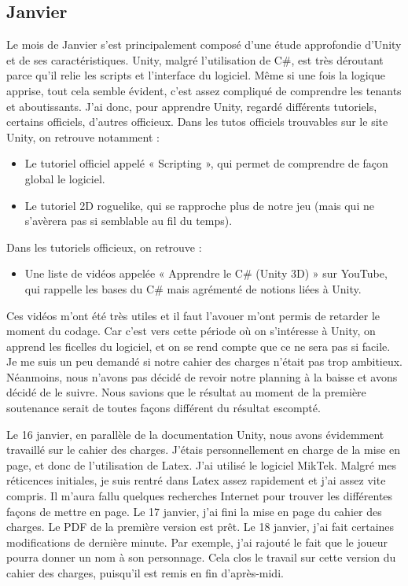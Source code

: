 \documentclass[]{extarticle}
\begin{document}
\begin{spacing}{1.25}
\subsection{Janvier}
\bigbreak
\bigbreak
Le mois de Janvier s’est principalement composé d’une étude approfondie d’Unity et de ses caractéristiques. Unity, malgré l’utilisation de C\#, est très déroutant parce qu’il relie les scripts et l’interface du logiciel. Même si une fois la logique apprise, tout cela semble évident, c’est assez compliqué de comprendre les tenants et aboutissants. 
\bigbreak
J’ai donc, pour apprendre Unity, regardé différents tutoriels, certains officiels, d’autres officieux. Dans les tutos officiels trouvables sur le site Unity, on retrouve notamment :
\bigbreak
\begin{itemize}
\item Le tutoriel officiel appelé « Scripting », qui permet de comprendre de façon global le logiciel.
\item Le tutoriel 2D roguelike, qui se rapproche plus de notre jeu (mais qui ne s’avèrera pas si semblable au fil du temps).
\end{itemize}
Dans les tutoriels officieux, on retrouve :
\bigbreak
\begin{itemize}
\item Une liste de vidéos appelée « Apprendre le C\# (Unity 3D) » sur YouTube, qui rappelle les bases du C\# mais agrémenté de notions liées à Unity.
\end{itemize}
\bigbreak
Ces vidéos m’ont été très utiles et il faut l’avouer m’ont permis de retarder le moment du codage. Car c’est vers cette période où on s’intéresse à Unity, on apprend les ficelles du logiciel, et on se rend compte que ce ne sera pas si facile. Je me suis un peu demandé si notre cahier des charges n’était pas trop ambitieux. 
\bigbreak
Néanmoins, nous n’avons pas décidé de revoir notre planning à la baisse et avons décidé de le suivre. Nous savions que le résultat au moment de la première soutenance serait de toutes façons différent du résultat escompté.
\bigbreak

\bigbreak
\bigbreak

 Le 16 janvier, en parallèle de la documentation Unity, nous avons évidemment travaillé sur le cahier des charges. J’étais personnellement en charge de la mise en page, et donc de l’utilisation de Latex. J’ai utilisé le logiciel MikTek.
\bigbreak
Malgré mes réticences initiales, je suis rentré dans Latex assez rapidement et j’ai assez vite compris. Il m’aura fallu quelques recherches Internet pour trouver les différentes façons de mettre en page.
\bigbreak
Le 17 janvier, j’ai fini la mise en page du cahier des charges. Le PDF de la première version est prêt.
\bigbreak
Le 18 janvier, j’ai fait certaines modifications de dernière minute. Par exemple, j’ai rajouté le fait que le joueur pourra donner un nom à son personnage. Cela clos le travail sur cette version du cahier des charges, puisqu’il est remis en fin d’après-midi.
\bigbreak


\end{spacing}
\end{document}
